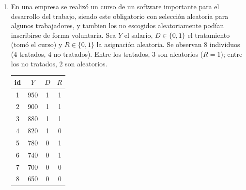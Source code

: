 \documentclass[10pt,a4paper]{article}
\begin{document}
\begin{enumerate}
\begin{enumerate}
\paragraph{4.1 C\'alculos en R.} Usamos \texttt{lm()}:

\begin{lstlisting}
# Datos
X1 <- c(4,3,5,7,6)
X2 <- c(1,2,3,4,4)
Y  <- c(5,7,10,13,12)
datos <- data.frame(X1, X2, Y)

# Modelo simple:
mod_simple <- lm(Y ~ X1, data=datos)
summary(mod_simple)
# (Muestra coeficientes, R^2, etc.)

# Modelo multiple:
mod_multiple <- lm(Y ~ X1 + X2, data=datos)
summary(mod_multiple)
# (Nuevos coeficientes, R^2 mayor, etc.)
\end{lstlisting}

\item ¿De que valor es el sesgo por variable omitida en este ejercicio? ¿Como es la correlación entre $X_1$ y $X_2$
\\
\textbf{Solución}
\\
Vemos que el beta en el modelo simple es de $\tilde{\hat{\beta_1}}=1.90$. Y en el modelo múltiple es $\hat{\beta_1}=0.39$, entonces el sesgo esta dado por:
$$\tilde{\hat{\beta_1}}=\hat{\beta_1}+\hat\beta_2\cdot \delta \implies 1.9 = 0.39 + \hat\beta_2\cdot \delta$$
$$\implies \hat\beta_2\cdot \delta = 1.9-0.39=1.51$$
El sesgo es positivo de valor 1.51, por lo que, como $\beta_2$ es positivo, entonces $\delta$ es positivo, y esto indica que la correlación entre $X_1$ y $X_2$ es positiva.

\end{enumerate}




\item En una empresa se realizó un curso de un software importante para el desarrollo del trabajo, siendo este obligatorio con selección aleatoria para algunos trabajadores, y tambien los no escogidos aleatoriamente podían inscribirse de forma voluntaria.
Sea $Y$ el salario, $D\in\{0,1\}$ el tratamiento (tomó el curso) y $R\in\{0,1\}$ la asignación aleatoria.
Se observan 8 individuos (4 tratados, 4 no tratados). Entre los tratados, 3 son aleatorios ($R=1$); entre los no tratados, 2 son aleatorios.

\begin{center}
\begin{tabular}{|c| c |c |c|}
\hline
id & $Y$ & $D$ & $R$\\
\hline
1 & 950 & 1 & 1\\
2 & 900 & 1 & 1\\
3 & 880 & 1 & 1\\
4 & 820 & 1 & 0\\
5 & 780 & 0 & 1\\
6 & 740 & 0 & 1\\
7 & 700 & 0 & 0\\
8 & 650 & 0 & 0\\
\hline
\end{tabular}
\end{center}


\end{enumerate}
\end{document}
